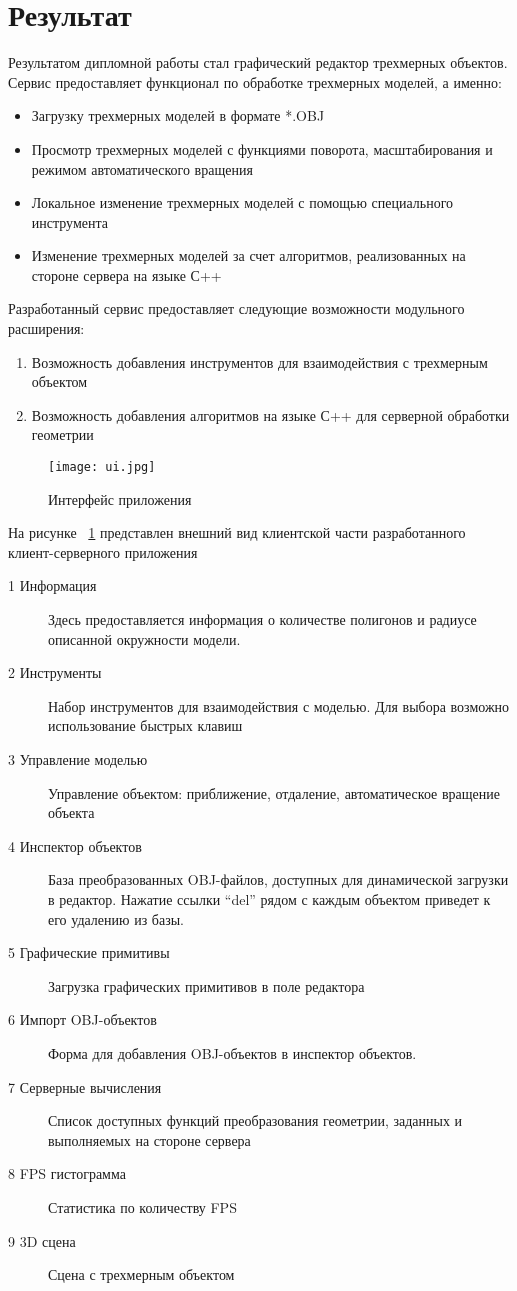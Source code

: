 \section{Результат}

Результатом дипломной работы стал графический редактор трехмерных объектов.
Сервис предоставляет функционал по обработке трехмерных моделей, а именно:
\begin{itemize}
    \item Загрузку трехмерных моделей в формате *.OBJ
    \item Просмотр трехмерных моделей с функциями поворота, масштабирования
    и режимом автоматического вращения
    \item Локальное изменение трехмерных моделей с помощью специального инструмента
    \item Изменение трехмерных моделей за счет алгоритмов,
    реализованных на стороне сервера на языке С++
\end{itemize}

Разработанный сервис предоставляет следующие возможности модульного
расширения:
\begin{enumerate}
    \item Возможность добавления инструментов для взаимодействия с
    трехмерным объектом
    \item Возможность добавления алгоритмов на языке С++ для серверной обработки
    геометрии
\end{enumerate}

\begin{figure}[htb]
\centering
\texttt{[image: ui.jpg]}
\caption{Интерфейс приложения}
\label{fig:ui}
\end{figure}

На рисунке ~\ref{fig:ui} представлен внешний вид клиентской части разработанного
клиент-серверного приложения
\begin{description}
    \item[1 Информация] Здесь предоставляется информация о количестве
    полигонов и радиусе описанной окружности модели.
    \item[2 Инструменты] Набор инструментов для
    взаимодействия с моделью. Для выбора возможно использование быстрых клавиш
    \item[3 Управление моделью] Управление объектом: приближение, отдаление,
    автоматическое вращение объекта
    \item[4 Инспектор объектов] База преобразованных OBJ-файлов, доступных для
    динамической загрузки в редактор. Нажатие ссылки ``del'' рядом с каждым объектом
    приведет к его удалению из базы.
    \item[5 Графические примитивы] Загрузка графических примитивов в поле
    редактора
    \item[6 Импорт OBJ-объектов] Форма для добавления OBJ-объектов в инспектор
    объектов.
    \item[7 Серверные вычисления] Список доступных функций преобразования
    геометрии, заданных и выполняемых на стороне сервера
    \item[8 FPS гистограмма] Статистика по количеству FPS
    \item[9 3D сцена] Сцена с трехмерным объектом
\end{description}
